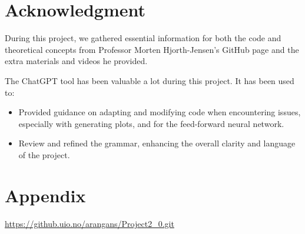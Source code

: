 \documentclass{article}
\newcommand{\0}{\mathbf{0}}
\newcommand{\1}{\mathbf{1}}
\begin{document}
\section{Acknowledgment}


During this project, we gathered essential information for both the code and theoretical concepts from Professor Morten Hjorth-Jensen’s GitHub page and the extra materials and videos he provided.


The ChatGPT tool has been valuable a lot during this project. It has been used to:
\begin{itemize}
    \item Provided guidance on adapting and modifying code when encountering issues, especially with generating plots, and for the feed-forward neural network.

    \item Review and refined the grammar, enhancing the overall clarity and language of the project.

\end{itemize}





\printbibliography





\section{Appendix}


\url{https://github.uio.no/arangans/Project2_0.git}
\end{document}
